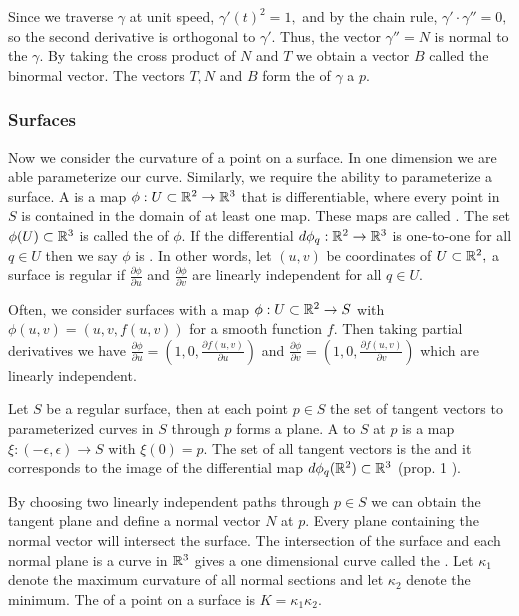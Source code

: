Since we traverse $\gamma$
at unit speed, $\gamma'(t)^2=1,$ and by the chain rule, $\gamma'\cdot \gamma''=0,$
so  the second derivative is orthogonal to $\gamma'$. Thus, the
vector $\gamma''=N$ is normal to the $\gamma$. 
By taking the cross product of $N$ and $T$ we obtain a vector $B$ called
the binormal vector.
The vectors $T,N$ and $B$ form the  of $\gamma$ a $p.$

\subsubsection{Surfaces}

Now we consider the curvature of a point on a surface. In one dimension we are
able parameterize our curve. Similarly, we require the ability to parameterize a surface.
A  is a map $\phi:U\subset \mathbb{R}^2 \to \mathbb{R}^3$ that
is differentiable, where every point in $S$ is contained in the domain of at least one map.
These maps are called .
 The set $\phi(U)\subset \mathbb{R}^3$ is called the  of $\phi$.
If the differential $d\phi_q:\mathbb{R}^2\to \mathbb{R}^3$ is one-to-one for all $q\in U$ then
we say $\phi$ is . In other words, let $(u,v)$ be coordinates of $U\subset \mathbb{R}^2,$
a surface is regular if $\frac{\partial\phi}{\partial u}$
and $\frac{\partial\phi}{\partial v}$ are linearly independent for all $q\in U$.

Often, we consider surfaces with a map $\phi:U\subset \mathbb{R}^2\to S$ with $\phi(u,v)=(u,v,f(u,v))$ for
a smooth function $f$. Then taking partial derivatives we have
$\frac{\partial\phi}{\partial u}=\left(1,0,\frac{\partial f(u,v)}{\partial u}\right)$ and 
$\frac{\partial\phi}{\partial v}=\left(1,0,\frac{\partial f(u,v)}{\partial v}\right)$
which are linearly independent.


Let $S$ be a regular surface, then at each point $p\in S$ the set of tangent vectors
to parameterized curves in $S$ through $p$ forms a plane.
A  to $S$ at $p$ is a map $\xi:(-\epsilon,\epsilon)\to S$ with $\xi(0)=p$.
The set of all tangent vectors is the  and it corresponds to the image
of the differential map $d\phi_q(\mathbb{R}^2)\subset \mathbb{R}^3$ (prop. 1 \cite{doc76}).


By choosing two linearly independent paths through $p\in S$ we can obtain the tangent
plane and define a normal vector $N$ at $p$.
Every plane containing the normal vector will intersect the surface.
The intersection of the surface and each normal plane is a curve in $\mathbb{R}^3$
gives a one dimensional curve called the . 
Let $\kappa_1$ denote the maximum curvature of all normal sections 
and let $\kappa_2$ denote the minimum. 
The  of a point on a surface is
$K=\kappa_1\kappa_2.$



